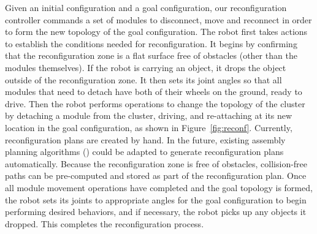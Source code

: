 \documentclass[conference]{IEEEtran}
\begin{document}
Given an initial configuration and a goal configuration, our reconfiguration controller commands a set of modules to disconnect, move and reconnect in order to form the new topology of the goal configuration. 
The robot first takes actions to establish the conditions needed for reconfiguration.  It begins by confirming that the reconfiguration zone is a flat surface free of obstacles (other than the modules themselves).  If the robot is carrying an object, it drops the object outside of the reconfiguration zone. It then  sets its joint angles so that all modules that need to detach have both of their wheels on the ground, ready to drive.
Then the robot performs operations to change the topology of the cluster by detaching a module from the cluster, driving, and re-attaching at its new location in the goal configuration, as shown in Figure~\ref{fig:reconf}.
Currently, reconfiguration plans are created by hand.  In the future, existing assembly planning algorithms (\cite{Werfel2007,Seo2013}) could be adapted to generate reconfiguration plans automatically.
Because the reconfiguration zone is free of obstacles, collision-free paths can be pre-computed and stored as part of the reconfiguration plan.
Once all module movement operations have completed and the goal topology is formed, the robot sets its joints to appropriate angles for the goal configuration to begin performing desired behaviors, and if necessary, the robot picks up any objects it dropped. This completes the reconfiguration process.


\end{document}
